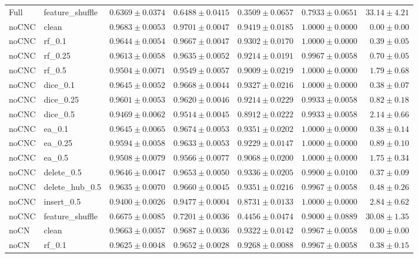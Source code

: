\documentclass[UTF8,a4paper,11pt,fontset=fandol]{ctexart}
\begin{document}
{\begin{longtable}{llrrrrr}
Full & feature\_shuffle & $0.6369\pm0.0374$ & $0.6488\pm0.0415$ & $0.3509\pm0.0657$ & $0.7933\pm0.0651$ & $33.14\pm4.21$ \\
noCNC & clean & $0.9683\pm0.0053$ & $0.9701\pm0.0047$ & $0.9419\pm0.0185$ & $1.0000\pm0.0000$ & $0.00\pm0.00$ \\
noCNC & rf\_0.1 & $0.9644\pm0.0054$ & $0.9667\pm0.0047$ & $0.9302\pm0.0170$ & $1.0000\pm0.0000$ & $0.39\pm0.05$ \\
noCNC & rf\_0.25 & $0.9613\pm0.0058$ & $0.9635\pm0.0052$ & $0.9214\pm0.0191$ & $0.9967\pm0.0058$ & $0.70\pm0.05$ \\
noCNC & rf\_0.5 & $0.9504\pm0.0071$ & $0.9549\pm0.0057$ & $0.9009\pm0.0219$ & $1.0000\pm0.0000$ & $1.79\pm0.68$ \\
noCNC & dice\_0.1 & $0.9645\pm0.0052$ & $0.9668\pm0.0044$ & $0.9327\pm0.0216$ & $1.0000\pm0.0000$ & $0.38\pm0.07$ \\
noCNC & dice\_0.25 & $0.9601\pm0.0053$ & $0.9620\pm0.0046$ & $0.9214\pm0.0229$ & $0.9933\pm0.0058$ & $0.82\pm0.18$ \\
noCNC & dice\_0.5 & $0.9469\pm0.0062$ & $0.9514\pm0.0045$ & $0.8912\pm0.0222$ & $0.9933\pm0.0058$ & $2.14\pm0.66$ \\
noCNC & ea\_0.1 & $0.9645\pm0.0065$ & $0.9674\pm0.0053$ & $0.9351\pm0.0202$ & $1.0000\pm0.0000$ & $0.38\pm0.14$ \\
noCNC & ea\_0.25 & $0.9594\pm0.0058$ & $0.9633\pm0.0053$ & $0.9229\pm0.0147$ & $1.0000\pm0.0000$ & $0.89\pm0.10$ \\
noCNC & ea\_0.5 & $0.9508\pm0.0079$ & $0.9566\pm0.0077$ & $0.9068\pm0.0200$ & $1.0000\pm0.0000$ & $1.75\pm0.34$ \\
noCNC & delete\_0.5 & $0.9646\pm0.0047$ & $0.9653\pm0.0050$ & $0.9336\pm0.0205$ & $0.9900\pm0.0100$ & $0.37\pm0.09$ \\
noCNC & delete\_hub\_0.5 & $0.9635\pm0.0070$ & $0.9660\pm0.0045$ & $0.9351\pm0.0216$ & $0.9967\pm0.0058$ & $0.48\pm0.26$ \\
noCNC & insert\_0.5 & $0.9400\pm0.0026$ & $0.9477\pm0.0004$ & $0.8731\pm0.0133$ & $1.0000\pm0.0000$ & $2.84\pm0.62$ \\
noCNC & feature\_shuffle & $0.6675\pm0.0085$ & $0.7201\pm0.0036$ & $0.4456\pm0.0474$ & $0.9000\pm0.0889$ & $30.08\pm1.35$ \\
noCN & clean & $0.9663\pm0.0057$ & $0.9687\pm0.0036$ & $0.9322\pm0.0142$ & $0.9967\pm0.0058$ & $0.00\pm0.00$ \\
noCN & rf\_0.1 & $0.9625\pm0.0048$ & $0.9652\pm0.0028$ & $0.9268\pm0.0088$ & $0.9967\pm0.0058$ & $0.38\pm0.15$ \\

\end{longtable}}
\end{document}
